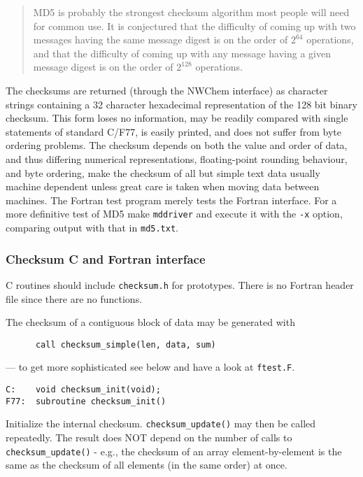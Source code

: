 \begin{quote}
MD5 is probably the strongest checksum algorithm most people will need
for common use.  It is conjectured that the difficulty of coming up
with two messages having the same message digest is on the order of
$2^64$ operations, and that the difficulty of coming up with any
message having a given message digest is on the order of $2^128$
operations.
\end{quote}

The checksums are returned (through the NWChem interface) as character
strings containing a 32 character hexadecimal representation of the
128 bit binary checksum.  This form loses no information, may be
readily compared with single statements of standard C/F77, is easily
printed, and does not suffer from byte ordering problems.  The
checksum depends on both the value and order of data, and thus
differing numerical representations, floating-point rounding
behaviour, and byte ordering, make the checksum of all but simple text
data usually machine dependent unless great care is taken when moving
data between machines.  The Fortran test program merely tests the
Fortran interface.  For a more definitive test of MD5 make
\verb+mddriver+ and execute it with the \verb+-x+ option, comparing
output with that in \verb+md5.txt+.

\subsubsection{Checksum C and Fortran interface}

C routines should include \verb+checksum.h+ for prototypes.
There is no Fortran header file since there are no functions.

The checksum of a contiguous block of data may be generated with 
\begin{verbatim}
      call checksum_simple(len, data, sum)
\end{verbatim}
--- to get more sophisticated see below and have a look at \verb+ftest.F+.

\begin{verbatim}
C:    void checksum_init(void);
F77:  subroutine checksum_init()
\end{verbatim}

  Initialize the internal checksum.  \verb+checksum_update()+ may then
  be called repeatedly.  The result does NOT depend on the number
  of calls to \verb+checksum_update()+ - e.g., the checksum of an array
  element-by-element is the same as the checksum of all elements 
  (in the same order) at once.

